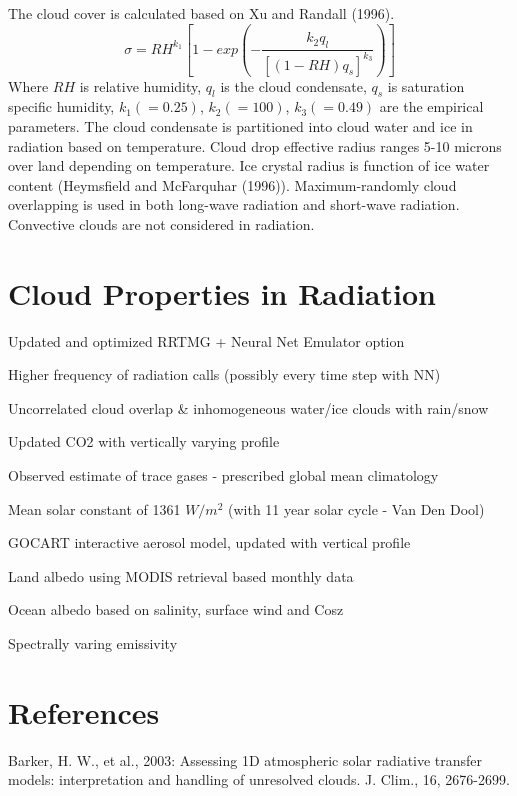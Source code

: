 The cloud cover is calculated based on Xu and Randall (1996). \[ \sigma =RH^{k_{1}}\left[1-exp\left(-\frac{k_{2}q_{l}}{\left[\left(1-RH\right)q_{s}\right]^{k_{3}}}\right)\right] \] Where $RH$ is relative humidity, $q_{l}$ is the cloud condensate, $q_{s}$ is saturation specific humidity, $k_{1}(=0.25)$, $k_{2}(=100)$, $k_{3}(=0.49)$ are the empirical parameters. The cloud condensate is partitioned into cloud water and ice in radiation based on temperature. Cloud drop effective radius ranges 5-\/10 microns over land depending on temperature. Ice crystal radius is function of ice water content (Heymsfield and Mc\+Farquhar (1996)). Maximum-\/randomly cloud overlapping is used in both long-\/wave radiation and short-\/wave radiation. Convective clouds are not considered in radiation.\hypertarget{index_component}{}\section{Cloud Properties in Radiation}\label{index_component}

\begin{DoxyItemize}
\item Updated and optimized R\+R\+T\+MG + Neural Net Emulator option
\item Higher frequency of radiation calls (possibly every time step with NN)
\item Uncorrelated cloud overlap \& inhomogeneous water/ice clouds with rain/snow
\item Updated C\+O2 with vertically varying profile
\item Observed estimate of trace gases -\/ prescribed global mean climatology
\item Mean solar constant of 1361 $W/m^2$ (with 11 year solar cycle -\/ Van Den Dool)
\item G\+O\+C\+A\+RT interactive aerosol model, updated with vertical profile
\item Land albedo using M\+O\+D\+IS retrieval based monthly data
\item Ocean albedo based on salinity, surface wind and Cosz
\item Spectrally varing emissivity
\end{DoxyItemize}\hypertarget{index_References}{}\section{References}\label{index_References}
Barker, H. W., et al., 2003\+: Assessing 1D atmospheric solar radiative transfer models\+: interpretation and handling of unresolved clouds. J. Clim., 16, 2676-\/2699.

